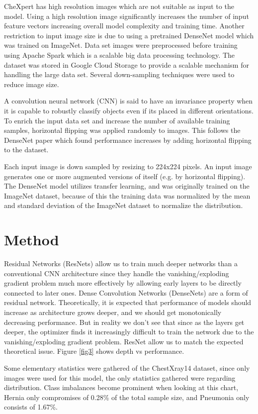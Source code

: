 \documentclass{amia}
\begin{document}
CheXpert\cite{ref2} has high resolution images which are not suitable as input to the model. Using a high resolution image significantly increases the number of input feature vectors increasing overall model complexity and training time. Another restriction to input image size is due to using a pretrained DenseNet model which was trained on ImageNet. Data set images were preprocessed before training using Apache Spark which is a scalable big data processing technology. The dataset was stored in Google Cloud Storage to provide a scalable mechanism for handling the large data set. Several down-sampling techniques were used to reduce image size.

A convolution neural network (CNN) is said to have an invariance property when it is capable to robustly classify objects even if its placed in different orientations. To enrich the input data set and increase the number of available training samples, horizontal flipping was applied randomly to images. This follows the DenseNet paper which found performance increases by adding horizontal flipping to the dataset.

Each input image is down sampled by resizing to 224x224 pixels. An input image generates one or more augmented versions of itself (e.g. by horizontal flipping). The DenseNet model utilizes transfer learning, and was originally trained on the ImageNet dataset, because of this the training data was normalized by the mean and standard deviation of the ImageNet dataset to normalize the distribution.

\section*{Method}
Residual Networks (ResNets) allow us to train much deeper networks than a conventional CNN architecture since they handle the vanishing/exploding gradient problem much more effectively by allowing early layers to be directly connected to later ones. Dense Convolution Networks (DenseNets) are a form of residual network. Theoretically, it is expected that performance of models should increase as architecture grows deeper, and we should get monotonically decreasing performance. But in reality we don't see that since as the layers get deeper, the optimizer finds it increasingly difficult to train the network due to the vanishing/exploding gradient problem. ResNet allow us to match the expected theoretical issue. Figure \ref{fig3} shows depth vs performance.

Some elementary statistics were gathered of the ChestXray14 dataset, since only images were used for this model, the only statistics gathered were regarding distribution. Class imbalances become prominent when looking at this chart, Hernia only compromises of 0.28\% of the total sample size, and Pneumonia only consists of 1.67\%.
\end{document}
